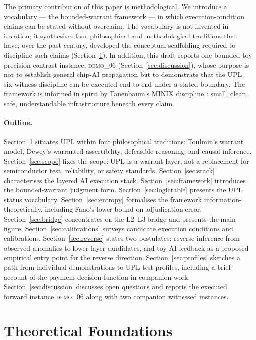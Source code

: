 \documentclass[11pt, a4paper]{article}
\theoremstyle{upldef}
\begin{document}
The primary contribution of this paper is methodological. We
introduce a vocabulary --- the bounded-warrant framework --- in
which execution-condition claims can be stated without overclaim.
The vocabulary is not invented in isolation; it synthesises four
philosophical and methodological traditions that have, over the past
century, developed the conceptual scaffolding required to discipline
such claims (Section~\ref{sec:foundations}). In addition, this draft
reports one bounded toy precision-contrast instance,
\textsc{demo\_06} (Section~\ref{sec:discussion}), whose purpose is
not to establish general chip-AI propagation but to demonstrate that
the UPL six-witness discipline can be executed end-to-end under a
stated boundary. The framework is informed in spirit by Tanenbaum's
MINIX discipline \citep{tanenbaum1987}: small, clean, safe,
understandable infrastructure beneath every claim.

\paragraph{Outline.}
Section~\ref{sec:foundations} situates UPL within four philosophical
traditions: Toulmin's warrant model, Dewey's warranted assertibility,
defeasible reasoning, and causal inference.
Section~\ref{sec:scope} fixes the scope: UPL is a warrant layer,
not a replacement for semiconductor test, reliability, or safety
standards. Section~\ref{sec:stack} characterises the layered AI
execution stack. Section~\ref{sec:framework} introduces the
bounded-warrant judgment form. Section~\ref{sec:logictable}
presents the UPL status vocabulary. Section~\ref{sec:entropy}
formalises the framework information-theoretically, including
Fano's lower bound on adjudication error. Section~\ref{sec:bridge}
concentrates on the L2--L3 bridge and presents the main figure.
Section~\ref{sec:calibrations} surveys candidate execution
conditions and calibrations. Section~\ref{sec:reverse} states two
postulates: reverse inference from observed anomalies to lower-layer
candidates, and toy-AI feedback as a proposed empirical entry point
for the reverse direction. Section~\ref{sec:profiles} sketches a
path from individual demonstrations to UPL test profiles, including
a brief account of the payment-decision function in companion work.
Section~\ref{sec:discussion} discusses open questions and reports
the executed forward instance \textsc{demo\_06} along with two
companion witnessed instances.

\section{Theoretical Foundations}
\label{sec:foundations}
\end{document}
